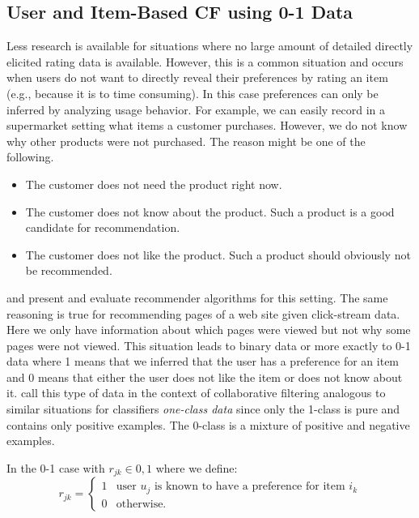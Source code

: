 \documentclass[nojss]{jss}
\begin{document}
\subsection{User and Item-Based CF using 0-1 Data}

Less research
is available for situations where no large amount of detailed
directly elicited rating data is available.
However, this is a common situation and occurs when
users do not want to directly reveal their preferences by rating an item 
(e.g., because it is to time consuming). In
this case preferences can only be inferred by analyzing usage behavior.
For
example, we can easily record in a supermarket setting what items a customer
purchases. However, we do not know why other products were not purchased.
The reason might be one of the following.
\begin{itemize}
\item The customer does not need the product right now.
\item The customer does not know about the product. Such a product
is a good candidate for recommendation.
\item The customer does not like the product. Such a product should 
obviously not
be recommended.
\end{itemize}

\cite{recommender:Mild:2003} and \cite{recommender:Lee:2005} 
present and evaluate 
recommender algorithms for this setting.
The same reasoning is true for
recommending pages of a web site given click-stream data. Here we only have
information about which pages were viewed but not why some pages were not
viewed. This situation leads to
binary data or more exactly to
0-1 data where 1 means that we inferred that
the user has a preference for an item and 0 means that either the user does not like the item or does not know about it. 
\cite{recommender:Pan:2008} call
this type of data in the context of collaborative filtering
analogous to similar situations for classifiers
\emph{one-class data} since only the 1-class is pure and contains only
positive examples. The 0-class is a mixture of positive and negative examples.


In the 0-1 case with $r_{jk} \in {0,1}$ where we define:
\begin{equation}
r_{jk}=
\begin{cases}
1& \text{user $u_j$ is known to have a preference for item $i_k$} \\
0& \text{otherwise.}
\end{cases}
\end{equation}
\end{document}
